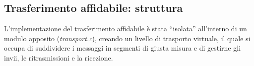 \subsection{Trasferimento affidabile: struttura}
L'implementazione del trasferimento affidabile è stata ``isolata'' all'interno
di un modulo apposito (\emph{transport.c}), creando un livello di trasporto 
virtuale, il quale si occupa di suddividere i messaggi in segmenti di giusta 
misura e di gestirne gli invii, le ritrasmissioni e la ricezione.
%






%
